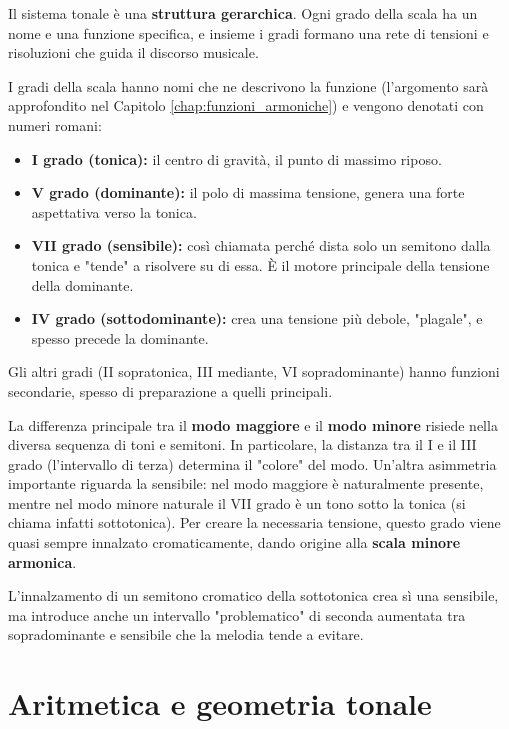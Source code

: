 Il sistema tonale è una \textbf{struttura gerarchica}. Ogni grado della scala ha un nome e una funzione specifica, e insieme i gradi formano una rete di tensioni e risoluzioni che guida il discorso musicale.

\begin{definizione}
	\label{def:gradi_scala}
	I gradi della scala hanno nomi che ne descrivono la funzione (l'argomento sarà approfondito nel Capitolo \ref{chap:funzioni_armoniche}) e vengono denotati con numeri romani:
	\begin{itemize}
		\item \textbf{I grado (tonica):} il centro di gravità, il punto di massimo riposo.
		\item \textbf{V grado (dominante):} il polo di massima tensione, genera una forte aspettativa verso la tonica.
		\item \textbf{VII grado (sensibile):} così chiamata perché dista solo un semitono dalla tonica e "tende" a risolvere su di essa. È il motore principale della tensione della dominante.
		\item \textbf{IV grado (sottodominante):} crea una tensione più debole, "plagale", e spesso precede la dominante.
	\end{itemize}
	Gli altri gradi (II sopratonica, III mediante, VI sopradominante) hanno funzioni secondarie, spesso di preparazione a quelli principali.
\end{definizione}

La differenza principale tra il \textbf{modo maggiore} e il \textbf{modo minore} risiede nella diversa sequenza di toni e semitoni. In particolare, la distanza tra il I e il III grado (l'intervallo di terza) determina il "colore" del modo. Un'altra asimmetria importante riguarda la sensibile: nel modo maggiore è naturalmente presente, mentre nel modo minore naturale il VII grado è un tono sotto la tonica (si chiama infatti sottotonica). Per creare la necessaria tensione, questo grado viene quasi sempre innalzato cromaticamente, dando origine alla \textbf{scala minore armonica}.

L'innalzamento di un semitono cromatico della sottotonica crea sì una sensibile, ma introduce anche un intervallo "problematico" di seconda aumentata tra sopradominante e sensibile che la melodia tende a evitare.

\section{Aritmetica e geometria tonale}
\label{sec:aritmetica_geometria}

